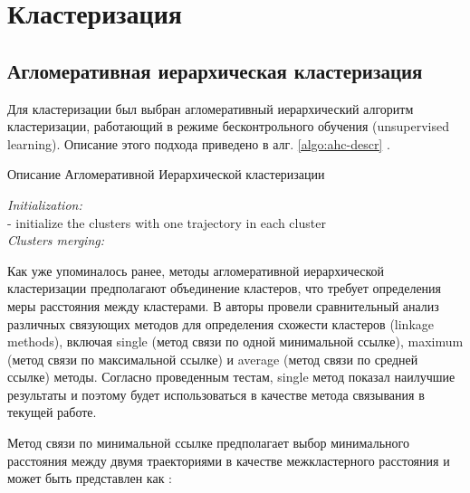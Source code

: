 \section{Кластеризация}

\subsection{Агломеративная иерархическая кластеризация}

Для кластеризации был выбран агломеративный иерархический алгоритм кластеризации, работающий в режиме бесконтрольного обучения (unsupervised learning). Описание этого подхода приведено в алг. \ref{algo:ahc-descr} \cite{inproceedings:7_related_work}.

\begin{algorithm}[!htb]
	\caption{Описание Агломеративной Иерархической кластеризации}
	\label{algo:ahc-descr}
	\SetAlgoLined
	\textit{Initialization:} \\
	- initialize the clusters with one trajectory in each cluster \\
	\textit{Clusters merging:}\\
\end{algorithm}

Как уже упоминалось ранее, методы агломеративной иерархической кластеризации предполагают объединение кластеров, что требует определения меры расстояния между кластерами. В \cite{inproceedings:7_related_work} авторы провели сравнительный анализ различных связующих методов для определения схожести кластеров (linkage methods), включая single (метод связи по одной минимальной ссылке), maximum (метод связи по максимальной ссылке) и average (метод связи по средней ссылке) методы. Согласно проведенным тестам, single метод показал наилучшие результаты и поэтому будет использоваться в качестве метода связывания в текущей работе.

Метод связи по минимальной ссылке предполагает выбор минимального расстояния между двумя траекториями в качестве межкластерного расстояния и может быть представлен как \cite{inproceedings:7_related_work}:

